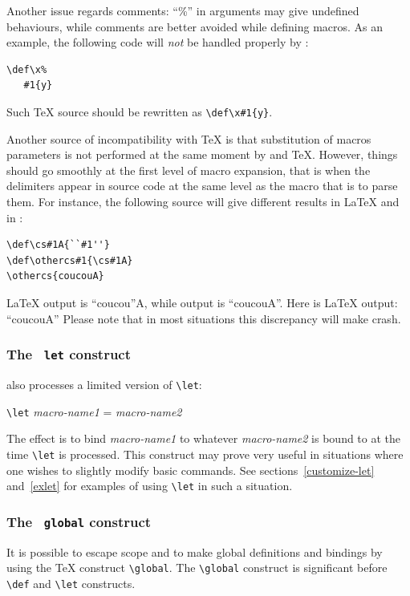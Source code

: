 Another issue regards comments: ``\%'' in arguments may give undefined
behaviours, while comments are better avoided while defining
macros. As an example, the following code will \emph{not}
be handled properly
by \hevea:
\begin{verbatim}
\def\x%
   #1{y}
\end{verbatim}
Such \TeX{} source should be rewritten as \verb+\def\x#1{y}+.


Another source of incompatibility with \TeX{} is that  substitution of
macros parameters is not performed at the same moment by \hevea{} and
\TeX{}.
However, things should go smoothly at the first level of macro
expansion, that is when the delimiters
appear in source code at the same level as the macro that is to
parse them.
For instance, the following source will give different results in
\LaTeX{} and in \hevea:
\begin{verbatim}
\def\cs#1A{``#1''}
\def\othercs#1{\cs#1A}
\othercs{coucouA}
\end{verbatim}
\LaTeX{} output is ``coucou''A, while \hevea{} output is ``coucouA''.
Here is \ifhevea\hevea\else\LaTeX\fi{} output:
{\def\cs#1A{``#1''}
\def\othercs#1{\cs#1A}
\othercs{coucouA}}
Please note that in most situations this discrepancy will make
\hevea{} crash. 


\subsubsection{The \texttt{ let} construct}
\hevea{} also processes a
limited version of \verb+\let+:
\begin{flushleft}
\verb+\let+ {\it macro-name1} = {\it macro-name2}
\end{flushleft}
The effect is to bind  {\it macro-name1} to whatever {\it macro-name2}
is bound to at the time \verb+\let+ is processed. This construct may
prove very useful in situations where
one wishes to slightly modify basic commands.
See sections~\ref{customize-let} and~\ref{exlet} for examples of using
\verb+\let+ in such a situation.




\subsubsection{The \texttt{ global} construct}
It is possible to escape scope and to make global definitions
and bindings by using the \TeX{} construct \verb+\global+.
The \verb+\global+ construct is significant before
\verb+\def+ and \verb+\let+ constructs.

